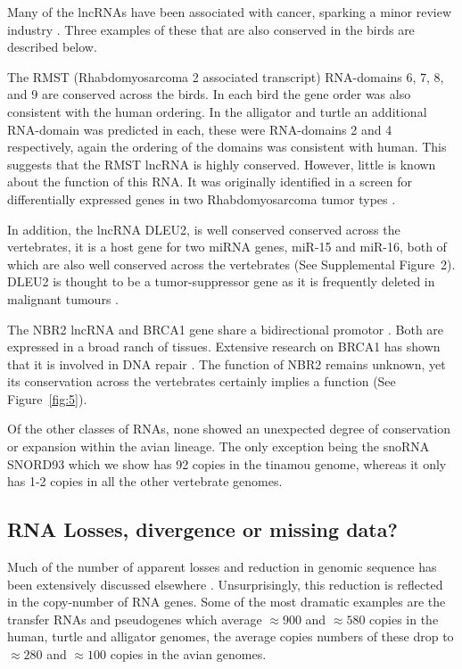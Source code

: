 \documentclass[10pt]{bmc_article}
\newenvironment{bmcformat}{\begin{raggedright}\baselineskip20pt\sloppy\setboolean{publ}{false}}{\end{raggedright}\baselineskip20pt\sloppy}
\begin{document}
\begin{bmcformat}
Many of the lncRNAs have been associated with cancer, sparking a minor
review industry \cite{Prensner:2011,Spizzo:2012}. Three examples of
these that are also conserved in the birds are described below.

The RMST (Rhabdomyosarcoma 2 associated transcript) RNA-domains 6, 7,
8, and 9 are conserved across the birds. In each bird the gene order
was also consistent with the human ordering. In the alligator and
turtle an additional RNA-domain was predicted in each, these were
RNA-domains 2 and 4 respectively, again the ordering of the domains
was consistent with human. This suggests that the RMST lncRNA is
highly conserved. However, little is known about the function of this
RNA. It was originally identified in a screen for differentially
expressed genes in two Rhabdomyosarcoma tumor types \cite{Chan:2002}.

In addition, the lncRNA DLEU2, is well conserved conserved across the
vertebrates, it is a host gene for two miRNA genes, miR-15 and miR-16,
both of which are also well conserved across the vertebrates (See
Supplemental Figure~2). DLEU2 is thought to be a tumor-suppressor gene
as it is frequently deleted in malignant tumours
\cite{Lerner:2009,Klein:2010}.

The NBR2 lncRNA and BRCA1 gene share a bidirectional promotor
\cite{Xu:1997}. Both are expressed in a broad ranch of
tissues. Extensive research on BRCA1 has shown that it is involved in
DNA repair \cite{Moynahan:1999}. The function of NBR2 remains unknown,
yet its conservation across the vertebrates certainly implies a
function (See Figure~\ref{fig:5}).

Of the other classes of RNAs, none showed an unexpected degree of
conservation or expansion within the avian lineage. The only exception
being the snoRNA SNORD93 which we show has 92 copies in the tinamou
genome, whereas it only has 1-2 copies in all the other vertebrate
genomes. 


\subsection*{RNA Losses, divergence or missing data?}

Much of the number of apparent losses and reduction in genomic
sequence has been extensively discussed elsewhere
\cite{Organ:2007}. Unsurprisingly, this reduction is reflected in the
copy-number of RNA genes. Some of the most dramatic examples are the
transfer RNAs and pseudogenes which average $\approx 900$ and $\approx
580$ copies in the human, turtle and alligator genomes, the average
copies numbers of these drop to $\approx 280$ and $\approx 100$ copies
in the avian genomes. 


\end{bmcformat}
\end{document}
